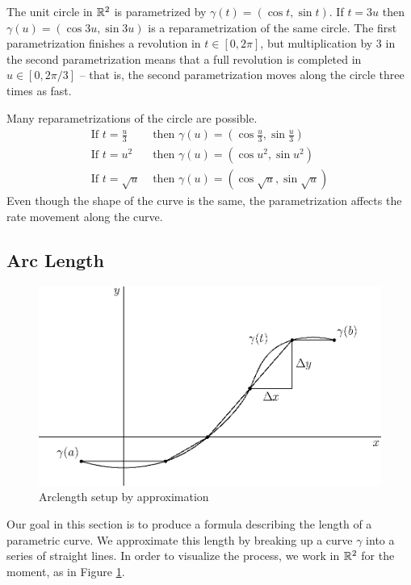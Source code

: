 \documentclass[fleqn,letterpaper]{report}
\begin{document}
\begin{example}
The unit circle in $\mathbb{R}^2$ is parametrized by
$\gamma(t) = (\cos t, \sin t)$. If $t = 3u$ then $\gamma(u) =
(\cos 3u, \sin 3u)$ is a reparametrization of the same circle.
The first parametrization finishes a revolution in $t \in [0,
2\pi]$, but multiplication by $3$ in the second parametrization
means that a full revolution is completed in $u \in [0,
2\pi/3]$ -- that is, the second parametrization moves along the
circle three times as fast. 

Many reparametrizations of the circle are possible.
\begin{align*}
\text{If } t = \frac{u}{3} & \text{ then } \gamma(u) = \left(
\cos \frac{u}{3}, \sin \frac{u}{3} \right) \\
\text{If } t = u^2 & \text{ then } \gamma(u) = \left(
\cos u^2, \sin u^2 \right) \\
\text{If } t = \sqrt{u} & \text{ then } \gamma(u) = \left(
\cos \sqrt{u}, \sin \sqrt{u} \right) 
\end{align*}
Even though the shape of the curve is the same, the
parametrization affects the rate movement along the curve. 
\end{example}

\subsection{Arc Length}
\label{arc-length}

\begin{figure}[t]
\centering
\includegraphics[width=12cm]{figure19.eps}
\caption{Arclength setup by approximation}
\label{figure-arclength-approximation}
\end{figure} 

Our goal in this section is to produce a formula describing
the length of a parametric curve. We approximate this length
by breaking up a curve $\gamma$ into a series of straight
lines. In order to visualize the process, we work in $\mathbb{R}^2$
for the moment, as in Figure \ref{figure-arclength-approximation}.
\end{document}
